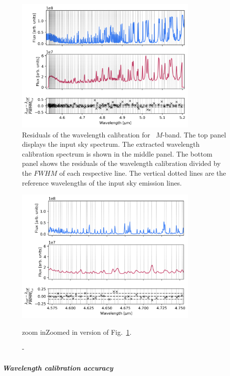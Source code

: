\begin{figure}[!ht]
  \centering
  \includegraphics[width=0.8\textwidth]{figures/LSS_CrtAlg_files/Residuals_m.png}
  \caption[LSS wavelength residuals]{Residuals of the wavelength calibration for \lss~$M$-band. The top panel displays the input sky spectrum. The extracted wavelength calibration spectrum is shown in the middle panel. The bottom panel shows the residuals of the wavelength calibration divided by the $FWHM$ of each respective line. The vertical dotted lines are the reference wavelengths of the input sky emission lines. }
  \label{fig:r_m}
\end{figure}

\begin{figure}[!ht]
  \centering
  \includegraphics[width=0.8\textwidth]{figures/LSS_CrtAlg_files/Residuals_m_z.png}
  \caption[LSS wavelength residuals] - zoom in{Zoomed in version of Fig.~\ref{fig:r_m}.
  }
  \label{fig:r_m_z}
\end{figure}

\subparagraph{Wavelength calibration accuracy}\label{sec:critalg_wavecal_acc}

